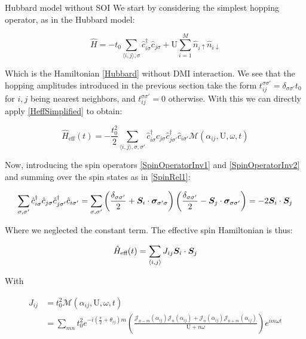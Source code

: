 \begin{section}{Hubbard model without SOI}
\label{Section3Hubbard}
We start by considering the simplest hopping operator, as in the Hubbard model:

\begin{equation}
\hat{H} = -t_0\sum_{\langle i,j \rangle, \sigma} \hat{c}_{i \sigma}^\dagger \hat{c}_{j \sigma} + \text{U} \sum_{i=1}^M \hat{n}_{i\uparrow}\hat{n}_{i\downarrow}
\end{equation}

Which is the Hamiltonian \ref{Hubbard} without DMI interaction. We see that the hopping amplitudes introduced in the previous section take the form $t_{ij}^{\sigma \sigma'} = \delta_{\sigma \sigma'} t_0$ for $i,j$ being nearest neighbors, and $t_{ij}^{\sigma \sigma'} = 0$ otherwise. With this we can directly apply \ref{HeffSimplified} to obtain:

\begin{equation}
\hat{H}_{\text{eff}}(t) = -\frac{t_0^2}{2} \sum_{\langle i,j \rangle, \sigma, \sigma'} \hat{c}_{i \sigma}^\dagger \hat{c}_{j \sigma} \hat{c}_{j \sigma'}^\dagger \hat{c}_{i \sigma'} \mathcal{M}(\alpha_{ij}, \text{U}, \omega, t)
\end{equation}

Now, introducing the spin operators \ref{SpinOperatorInv1} and \ref{SpinOperatorInv2} and summing over the spin states as in \ref{SpinRel1}:

\begin{align*}
\sum_{\sigma, \sigma'} \hat{c}_{i \sigma}^\dagger \hat{c}_{j \sigma} \hat{c}_{j \sigma'}^\dagger \hat{c}_{i \sigma'} = \sum_{\sigma, \sigma'} \left( \frac{\delta_{\sigma \sigma'}}{2} + \boldsymbol{S}_i\cdot\boldsymbol{\sigma}_{\sigma' \sigma} \right) \left( \frac{\delta_{\sigma \sigma'}}{2} - \boldsymbol{S}_j\cdot\boldsymbol{\sigma}_{\sigma \sigma'} \right) = -2\boldsymbol{S}_i\cdot \boldsymbol{S}_j
\end{align*}

Where we neglected the constant term. The effective spin Hamiltonian is thus:

\begin{equation}
\hat{H}_{\text{eff}}(t) = \sum_{\langle i,j \rangle} J_{ij} \boldsymbol{S}_i \cdot \boldsymbol{S}_j
\end{equation}

With 

\begin{align}
J_{ij} &= t_0^2 \mathcal{M}(\alpha_{ij}, \text{U}, \omega, t) \nonumber \\
&=\sum_{mn} t_0^2 e^{-i(\frac{\pi}{2}+\theta_{ij})m}\left(\frac{\mathcal{J}_{n-m}(\alpha_{ij})\mathcal{J}_{n}(\alpha_{ij})+\mathcal{J}_{n}(\alpha_{ij})\mathcal{J}_{n+m}(\alpha_{ij})}{\text{U}+n\omega} \right) e^{im\omega t} \label{Jij1}
\end{align}


\end{section}
